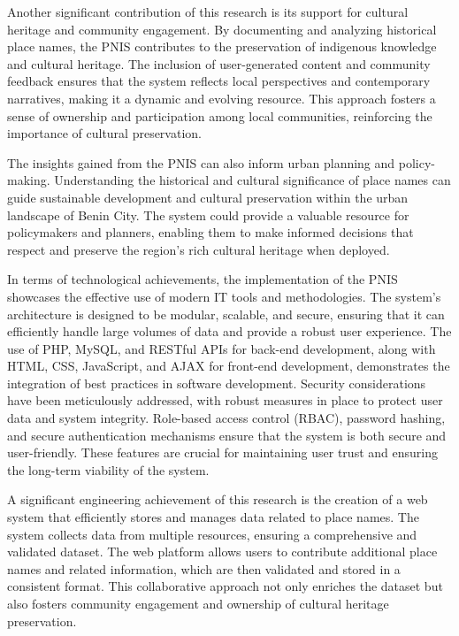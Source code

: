 Another significant contribution of this research is its support for cultural heritage and community engagement. By documenting and analyzing historical place names, the PNIS contributes to the preservation of indigenous knowledge and cultural heritage. The inclusion of user-generated content and community feedback ensures that the system reflects local perspectives and contemporary narratives, making it a dynamic and evolving resource. This approach fosters a sense of ownership and participation among local communities, reinforcing the importance of cultural preservation.

The insights gained from the PNIS can also inform urban planning and policy-making. Understanding the historical and cultural significance of place names can guide sustainable development and cultural preservation within the urban landscape of Benin City. The system could provide a valuable resource for policymakers and planners, enabling them to make informed decisions that respect and preserve the region’s rich cultural heritage when deployed.

In terms of technological achievements, the implementation of the PNIS showcases the effective use of modern IT tools and methodologies. The system's architecture is designed to be modular, scalable, and secure, ensuring that it can efficiently handle large volumes of data and provide a robust user experience. The use of PHP, MySQL, and RESTful APIs for back-end development, along with HTML, CSS, JavaScript, and AJAX for front-end development, demonstrates the integration of best practices in software development. Security considerations have been meticulously addressed, with robust measures in place to protect user data and system integrity. Role-based access control (RBAC), password hashing, and secure authentication mechanisms ensure that the system is both secure and user-friendly. These features are crucial for maintaining user trust and ensuring the long-term viability of the system.

A significant engineering achievement of this research is the creation of a web system that efficiently stores and manages data related to place names. The system collects data from multiple resources, ensuring a comprehensive and validated dataset. The web platform allows users to contribute additional place names and related information, which are then validated and stored in a consistent format. This collaborative approach not only enriches the dataset but also fosters community engagement and ownership of cultural heritage preservation.

